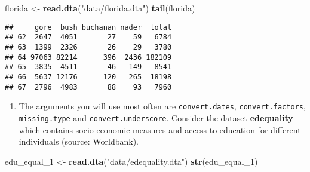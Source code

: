 \documentclass[]{article}
\newenvironment{Shaded}{\begin{snugshade}}{\end{snugshade}}
\newcommand{\KeywordTok}[1]{\textcolor[rgb]{0.13,0.29,0.53}{\textbf{#1}}}
\newcommand{\DecValTok}[1]{\textcolor[rgb]{0.00,0.00,0.81}{#1}}
\newcommand{\StringTok}[1]{\textcolor[rgb]{0.31,0.60,0.02}{#1}}
\newcommand{\NormalTok}[1]{#1}
\providecommand{\tightlist}{%
  \setlength{\itemsep}{0pt}\setlength{\parskip}{0pt}}
\begin{document}
\begin{Shaded}
\begin{Highlighting}[]
\NormalTok{florida <-}\StringTok{ }\KeywordTok{read.dta}\NormalTok{(}\StringTok{"data/florida.dta"}\NormalTok{)}
\KeywordTok{tail}\NormalTok{(florida)}
\end{Highlighting}
\end{Shaded}

\begin{verbatim}
##     gore  bush buchanan nader  total
## 62  2647  4051       27    59   6784
## 63  1399  2326       26    29   3780
## 64 97063 82214      396  2436 182109
## 65  3835  4511       46   149   8541
## 66  5637 12176      120   265  18198
## 67  2796  4983       88    93   7960
\end{verbatim}

\begin{enumerate}
\def\labelenumi{\arabic{enumi}.}
\setcounter{enumi}{1}
\tightlist
\item
  The arguments you will use most often are \texttt{convert.dates},
  \texttt{convert.factors}, \texttt{missing.type} and
  \texttt{convert.underscore}. Consider the dataset \textbf{edequality}
  which contains socio-economic measures and access to education for
  different individuals (source: Worldbank).
\end{enumerate}

\begin{Shaded}
\begin{Highlighting}[]
\NormalTok{edu_equal_}\DecValTok{1}\NormalTok{ <-}\StringTok{ }\KeywordTok{read.dta}\NormalTok{(}\StringTok{"data/edequality.dta"}\NormalTok{)}
\KeywordTok{str}\NormalTok{(edu_equal_}\DecValTok{1}\NormalTok{)}
\end{Highlighting}
\end{Shaded}
\end{document}
